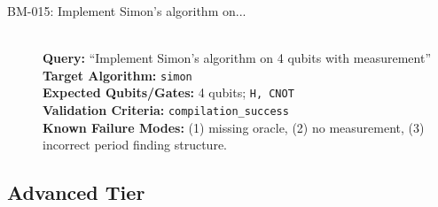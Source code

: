 \begin{description}
    \item[BM-015: Implement Simon's algorithm on...] \ \\
    \textbf{Query:} ``Implement Simon's algorithm on 4 qubits with measurement'' \\
    \textbf{Target Algorithm:} \texttt{simon} \\
    \textbf{Expected Qubits/Gates:} 4 qubits; \texttt{H, CNOT} \\
    \textbf{Validation Criteria:} \texttt{compilation\_success} \\
    \textbf{Known Failure Modes:} (1) missing oracle, (2) no measurement, (3) incorrect period finding structure.

\end{description}


\subsection*{Advanced Tier}
